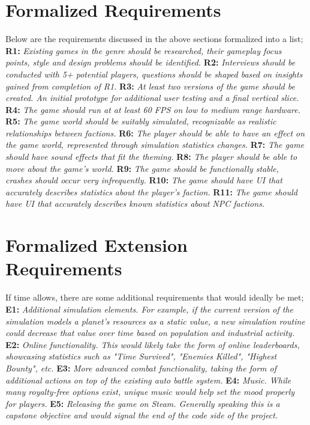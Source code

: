 \documentclass{report}
\newcommand{\req}[2]{\textbf{		#1:  }	\textit{#2}\newline\newline}
\begin{document}
\section{Formalized Requirements}
Below are the requirements discussed in the above sections formalized into a list;
\newline
\newline
\req{R1}{Existing games in the genre should be researched, their gameplay focus points, style and design problems should be identified.}
\req{R2}{Interviews should be conducted with 5+ potential players, questions should be shaped based on insights gained from completion of R1.}
\req{R3}{At least two versions of the game should be created. An initial prototype for additional user testing and a final vertical slice.}
\req{R4}{The game should run at at least 60 FPS on low to medium range hardware.}
\req{R5}{The game world should be suitably simulated, recognizable as realistic relationships between factions.}
\req{R6}{The player should be able to have an effect on the game world, represented through simulation statistics changes.}
\req{R7}{The game should have sound effects that fit the theming.}
\req{R8}{The player should be able to move about the game's world.}
\req{R9}{The game should be functionally stable, crashes should occur very infrequently.}
\req{R10}{The game should have UI that accurately describes statistics about the player's faction.}
\req{R11}{The game should have UI that accurately describes known statistics about NPC factions.}

\section{Formalized Extension Requirements}

If time allows, there are some additional requirements that would ideally be met;
\newline
\newline
\req{E1}{Additional simulation elements. For example, if the current version of the simulation models a planet's resources as a static value, a new simulation routine could decrease that value over time based on population and industrial activity.}
\req{E2}{Online functionality. This would likely take the form of online leaderboards, showcasing statistics such as "Time Survived", "Enemies Killed", "Highest Bounty", etc.}
\req{E3}{More advanced combat functionality, taking the form of additional actions on top of the existing auto battle system. }
\req{E4}{Music. While many royalty-free options exist, unique music would help set the mood properly for players.}
\req{E5}{Releasing the game on Steam. Generally speaking this is a capstone objective and would signal the end of the code side of the project. }
\end{document}

